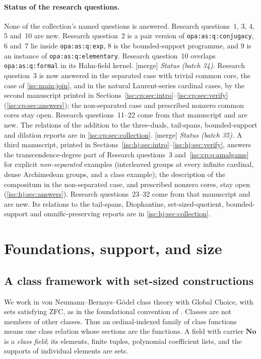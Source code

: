 \documentclass[11pt,letterpaper]{article}
\theoremstyle{definition}
\theoremstyle{remark}
\newcommand{\No}{\mathbf{No}}
\newcommand{\lbl}[1]{\nolinkurl{#1}}%
\newcommand{\mtag}{\textup{[merge]}}%
\numberwithin{equation}{section}
\begin{document}
\paragraph{Status of the research questions.} None of the collection's
named questions is answered. Research questions~1, 3, 4, 5 and~10 are new.
Research question~2 is a pair version of \lbl{opa:as:q:conjugacy}, 6 and~7
lie inside \lbl{opa:as:q:exp}, 8 is the bounded-support programme, and 9 is
an instance of \lbl{opa:as:q:elementary}. Research question~10 overlaps
\lbl{opa:as:q:formal} in its Hahn-field kernel.
\mtag{} \emph{Status (batch 34).} Research question~3 is now answered in
the separated case with trivial common core, the case of
\cref{isc:main:join}, and in the natural Laurent-series cardinal cases, by
the second manuscript printed in
Sections~\ref{isc:cp:sec:intro}--\ref{isc:cp:sec:verify}
(\cref{isc:cp:sec:answers}); the non-separated case and prescribed nonzero
common cores stay open. Research questions~11--22 come from that
manuscript and are new. The relations of the addition to the three-duals,
tail-spans, bounded-support and dilation reports are in
\cref{isc:cp:sec:collection}.
\mtag{} \emph{Status (batch 35).} A third manuscript, printed in
Sections~\ref{isc:hj:sec:intro}--\ref{isc:hj:sec:verify}, answers the
transcendence-degree part of Research questions~3
and~\ref{isc:cp:q:amalgams} for explicit \emph{non-separated} examples
(interleaved groups at every infinite cardinal, dense Archimedean groups,
and a class example); the description of the compositum in the
non-separated case, and prescribed nonzero cores, stay open
(\cref{isc:hj:sec:answers}). Research questions~23--32 come from that
manuscript and are new. Its relations to the tail-spans, Diophantine,
set-sized-quotient, bounded-support and omnific-preserving reports are in
\cref{isc:hj:sec:collection}.

\section{Foundations, support, and size}\label{isc:sec:foundations}

\subsection{A class framework with set-sized constructions}

We work in von Neumann--Bernays--G\"odel class theory with Global Choice,
with sets satisfying ZFC, as in the foundational convention of
\cite{vdDE}. Classes are not members of other classes. Thus an
ordinal-indexed family of class functions means one class relation whose
sections are the functions. A field with carrier $\No$ is a \emph{class
field}; its elements, finite tuples, polynomial coefficient lists, and the
supports of individual elements are sets.
\end{document}

